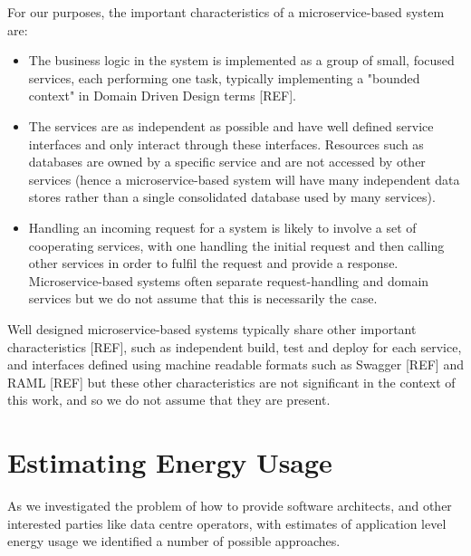 For our purposes, the important characteristics of a microservice-based system are:

\begin{itemize}
\item The business logic in the system is implemented as a group of small, focused services, each performing one task, typically implementing a "bounded context" in Domain Driven Design terms [REF].
\item The services are as independent as possible and have well defined service interfaces and only interact through these interfaces.  Resources such as databases are owned by a specific service and are not accessed by other services (hence a microservice-based system will have many independent data stores rather than a single consolidated database used by many services).
\item Handling an incoming request for a system is likely to involve a set of cooperating services, with one handling the initial request and then calling other services in order to fulfil the request and provide a response.  Microservice-based systems often separate request-handling and domain services but we do not assume that this is necessarily the case.
\end{itemize}

Well designed microservice-based systems typically share other important characteristics [REF], such as independent build, test and deploy for each service, and interfaces defined using machine readable formats such as Swagger [REF] and RAML [REF] but these other characteristics are not significant in the context of this work, and so we do not assume that they are present.

\section{Estimating Energy Usage}

As we investigated the problem of how to provide software architects, and other interested parties like data centre operators, with estimates of application level energy usage we identified a number of possible approaches.  

